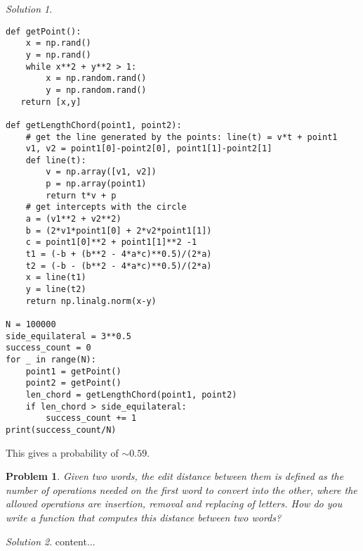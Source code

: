 \documentclass[12pt, letterpaper]{amsart}
\numberwithin{equation}{section} %
\newtheorem{problem}{Problem}
\theoremstyle{definition}
\theoremstyle{remark}
\newtheorem*{solution}{Solution}
\begin{document}
\begin{solution}
\begin{enumerate}[a.]
\begin{lstlisting}
def getPoint():
    x = np.rand()
    y = np.rand()
    while x**2 + y**2 > 1:
        x = np.random.rand()
        y = np.random.rand()
   return [x,y]

def getLengthChord(point1, point2):
    # get the line generated by the points: line(t) = v*t + point1
    v1, v2 = point1[0]-point2[0], point1[1]-point2[1]
    def line(t):
        v = np.array([v1, v2])
        p = np.array(point1)
        return t*v + p
    # get intercepts with the circle
    a = (v1**2 + v2**2)
    b = (2*v1*point1[0] + 2*v2*point1[1])
    c = point1[0]**2 + point1[1]**2 -1
    t1 = (-b + (b**2 - 4*a*c)**0.5)/(2*a)
    t2 = (-b - (b**2 - 4*a*c)**0.5)/(2*a)
    x = line(t1)
    y = line(t2)
    return np.linalg.norm(x-y)

N = 100000
side_equilateral = 3**0.5
success_count = 0
for _ in range(N):
    point1 = getPoint()
    point2 = getPoint()
    len_chord = getLengthChord(point1, point2)
    if len_chord > side_equilateral:
        success_count += 1
print(success_count/N)
\end{lstlisting}
This gives a probability of $\sim 0.59$.
\end{enumerate}
\end{solution}


\begin{problem}
Given two words, the \emph{edit distance} between them is defined as the number of operations needed on the first word to convert into the other, where the allowed operations are insertion, removal and replacing of letters. How do you write a function that computes this distance between two words?
\end{problem}
\begin{solution}
content...
\end{solution}
\end{document}
